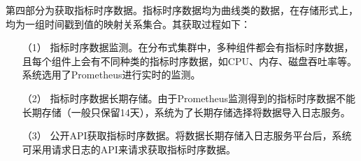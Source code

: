 


第四部分为获取指标时序数据。指标时序数据均为曲线类的数据，在存储形式上，均为一组时间戳到值的映射关系集合。其获取过程如下：
\begin{itemize}
    \item [（1）]指标时序数据监测。在分布式集群中，多种组件都会有指标时序数据，且每个组件上会有不同种类的指标时序数据，如CPU、内存、磁盘吞吐率等。系统选用了Prometheus进行实时的监测。
    \item [（2）]指标时序数据长期存储。由于Prometheus监测得到的指标时序数据不能长期存储（一般只保留14天），系统为了长期存储选择将数据导入日志服务。
    \item [（3）]公开API获取指标时序数据。将数据长期存储入日志服务平台后，系统可采用请求日志的API来请求获取指标时序数据。
\end{itemize}

